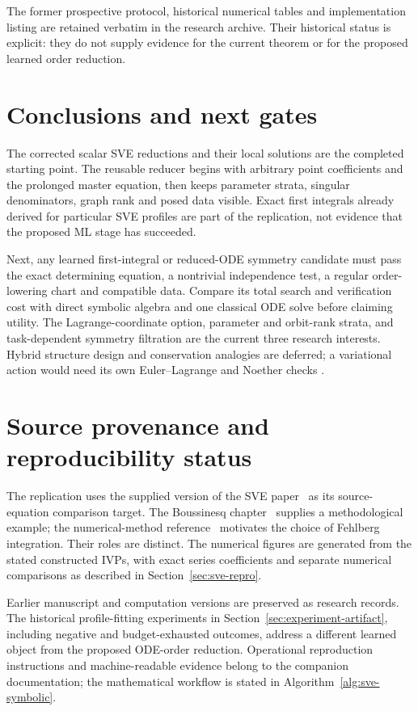\documentclass[11pt]{article}
\theoremstyle{definition}
\begin{document}
The former prospective protocol, historical numerical tables and
implementation listing are retained verbatim in the research archive.
Their historical status is explicit: they do not supply evidence for the
current theorem or for the proposed learned order reduction.

\section{Conclusions and next gates}
The corrected scalar SVE reductions and their local solutions are the
completed starting point. The reusable reducer begins with arbitrary point
coefficients and the prolonged master equation, then keeps parameter strata,
singular denominators, graph rank and posed data visible. Exact first
integrals already derived for particular SVE profiles are part of the
replication, not evidence that the proposed ML stage has succeeded.

Next, any learned first-integral or reduced-ODE symmetry candidate must pass
the exact determining equation, a nontrivial independence test, a regular
order-lowering chart and compatible data. Compare its total search and
verification cost with direct symbolic algebra and one classical ODE solve
before claiming utility. The Lagrange-coordinate option, parameter and
orbit-rank strata, and task-dependent symmetry filtration are the current
three research interests. Hybrid structure design and conservation analogies
are deferred; a variational action would need its own Euler--Lagrange and
Noether checks \cite{noether}.

\section{Source provenance and reproducibility status}
The replication uses the supplied version of the SVE paper~\cite{ap}
as its source-equation comparison target. The Boussinesq
chapter~\cite{bruzon-gandarias-2021} supplies a methodological example;
the numerical-method reference~\cite{uddin2016rkf} motivates the choice
of Fehlberg integration. Their roles are distinct. The numerical figures
are generated from the stated constructed IVPs, with exact series
coefficients and separate numerical comparisons as described in
Section~\ref{sec:sve-repro}.

Earlier manuscript and computation versions are preserved as research
records. The historical profile-fitting experiments in
Section~\ref{sec:experiment-artifact}, including negative and
budget-exhausted outcomes, address a different learned object from the
proposed ODE-order reduction. Operational reproduction instructions and
machine-readable evidence belong to the companion documentation; the
mathematical workflow is stated in Algorithm~\ref{alg:sve-symbolic}.
\end{document}
